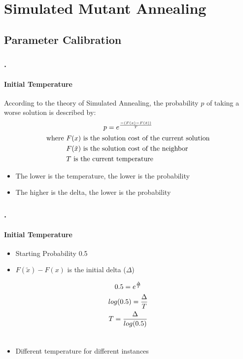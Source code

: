 \documentclass{beamer}
\begin{document}
\section{Simulated Mutant Annealing}

\subsection{Parameter Calibration}

\begin{frame}
\frametitle{\thesection.\thesubsection \ \insertsubsection}
\framesubtitle{Initial Temperature}
	According to the theory of Simulated Annealing, the probability $p$ of taking a worse solution is described by:
	\begin{gather}\label{eq:3.1}
	p = e^{\frac{-(F(x)-F(\tilde{x}))}{T}}\\
\begin{aligned}
\text{where } &F(x) \text{ is the solution cost of the current solution}\\
&F(\tilde{x}) \text{ is the solution cost of the neighbor}\\
&T \text{ is the current temperature}
\end{aligned}\notag
	\end{gather}
	
\vfill
\begin{itemize}
	\item The lower is the temperature, the lower is the probability
	\item The higher is the delta, the lower is the probability
\end{itemize}

\end{frame}
\begin{frame}
\frametitle{\thesection.\thesubsection \ \insertsubsection}
\framesubtitle{Initial Temperature}
\begin{itemize}
	\item Starting Probability 0.5
	\item $F(\tilde{x})-F(x)$ is the initial delta ($\Delta$)
\end{itemize}
\begin{gather}\label{eq:3.2}
0.5 = e^{\frac{\Delta}{T}}\notag\\
log(0.5) = \frac{\Delta}{T}\notag\\
T = \frac{\Delta}{log(0.5)}\\\notag
\end{gather}

\begin{itemize}
	\item Different temperature for different instances
\end{itemize}

\end{frame}
\end{document}
